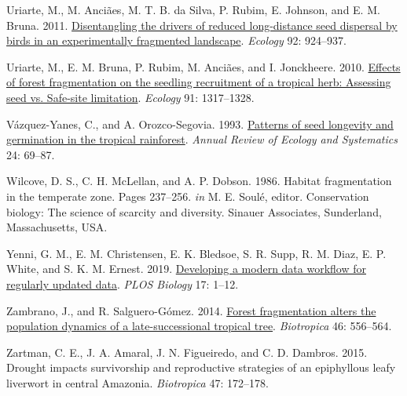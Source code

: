 \documentclass[
  man, donotrepeattitle,floatsintext]{apa6}
\newlength{\cslhangindent}
\newlength{\cslentryspacingunit} %
\newenvironment{CSLReferences}[2] %
 {%
  \setlength{\parindent}{0pt}
  \ifodd #1
  \let\oldpar\par
  \def\par{\hangindent=\cslhangindent\oldpar}
  \fi
  \setlength{\parskip}{#2\cslentryspacingunit}
 }%
 {}
\begin{document}
\begin{CSLReferences}{1}{0}
\leavevmode{}%
Uriarte, M., M. Anciães, M. T. B. da Silva, P. Rubim, E. Johnson, and E. M. Bruna. 2011. \href{https://doi.org/10.1890/10-0709.1}{Disentangling the drivers of reduced long-distance seed dispersal by birds in an experimentally fragmented landscape}. \emph{Ecology} 92: 924--937.

\leavevmode{}%
Uriarte, M., E. M. Bruna, P. Rubim, M. Anciães, and I. Jonckheere. 2010. \href{https://doi.org/10.1890/09-0785.1}{Effects of forest fragmentation on the seedling recruitment of a tropical herb: Assessing seed vs. Safe-site limitation}. \emph{Ecology} 91: 1317--1328.

\leavevmode{}%
Vázquez-Yanes, C., and A. Orozco-Segovia. 1993. \href{https://doi.org/10.1146/annurev.es.24.110193.000441}{Patterns of seed longevity and germination in the tropical rainforest}. \emph{Annual Review of Ecology and Systematics} 24: 69--87.

\leavevmode{}%
Wilcove, D. S., C. H. McLellan, and A. P. Dobson. 1986. Habitat fragmentation in the temperate zone. Pages 237--256. \emph{in} M. E. Soulé, editor. Conservation biology: {The} science of scarcity and diversity. Sinauer Associates, Sunderland, Massachusetts, USA.

\leavevmode{}%
Yenni, G. M., E. M. Christensen, E. K. Bledsoe, S. R. Supp, R. M. Diaz, E. P. White, and S. K. M. Ernest. 2019. \href{https://doi.org/10.1371/journal.pbio.3000125}{Developing a modern data workflow for regularly updated data}. \emph{PLOS Biology} 17: 1--12.

\leavevmode{}%
Zambrano, J., and R. Salguero-Gómez. 2014. \href{https://doi.org/10.1111/btp.12144}{Forest fragmentation alters the population dynamics of a late-successional tropical tree}. \emph{Biotropica} 46: 556--564.

\leavevmode{}%
Zartman, C. E., J. A. Amaral, J. N. Figueiredo, and C. D. Dambros. 2015. Drought impacts survivorship and reproductive strategies of an epiphyllous leafy liverwort in central {Amazonia}. \emph{Biotropica} 47: 172--178.

\end{CSLReferences}
\end{document}
